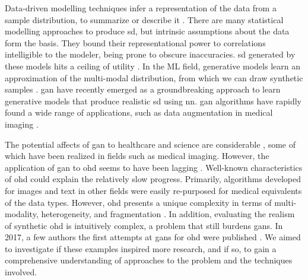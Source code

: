         Data-driven modelling techniques infer a representation of the data from a sample distribution, to summarize or describe it \cite{Hand2019}. There are many statistical modelling approaches to produce \gls{sd}, but intrinsic assumptions about the data form the basis. They bound their representational power to correlations intelligible to the modeler, being prone to obscure inaccuracies. \gls{sd} generated by these models hits a ceiling of utility \cite{Rankin2020}. In the ML field, generative models learn an approximation of the multi-modal distribution, from which we can draw synthetic samples  \cite{goodgan}. \Gls{gan} \cite{goodgan} have recently emerged as a groundbreaking approach to learn generative models that produce realistic \gls{sd} using \gls{nn}. \gls{gan} algorithms have rapidly found a wide range of applications, such as data augmentation in medical imaging \cite{Yi2019, Wang2020, Zhou2020}.\par
        
        The potential affects of \gls{gan} to healthcare and science are considerable \cite{Rankin2020}, some of which have been realized in fields such as medical imaging. However, the application of \gls{gan} to \gls{ohd} seems to have been lagging \cite{Xiao_2018_chall}. Well-known characteristics of \gls{ohd} could explain the relatively slow progress. Primarily, algorithms developed for images and text in other fields were easily re-purposed for medical equivalents of the data types. However, \gls{ohd} presents a unique complexity in terms of multi-modality, heterogeneity, and fragmentation \cite{Xiao_2018_chall}. In addition, evaluating the realism of synthetic \gls{ohd} is intuitively complex, a problem that still burdens \glspl{gan}. In 2017, a few authors the first attempts at \glspl{gan} for \gls{ohd} were published \cite{esteban2017real,Che_2017,Choi2017-nt,yahi2017generative}. We aimed to investigate if these examples inspired more research, and if so, to gain a comprehensive understanding of approaches to the problem and the techniques involved.